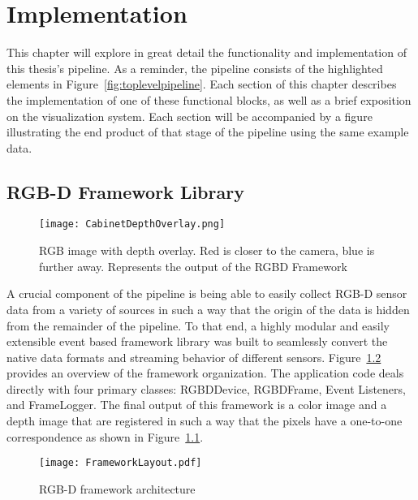 \chapter{Implementation}
\label{chap:implementation}
This chapter will explore in great detail the functionality and implementation of this thesis's pipeline. As a reminder, the pipeline consists of the highlighted elements in Figure~\ref{fig:toplevelpipeline}. Each section of this chapter describes the implementation of one of these functional blocks, as well as a brief exposition on the visualization system. Each section will be accompanied by a figure illustrating the end product of that stage of the pipeline using the same example data.

\section{RGB-D Framework Library}
\begin{figure}[ht]
    \centering
    \texttt{[image: CabinetDepthOverlay.png]}
    \caption{RGB image with depth overlay. Red is closer to the camera, blue is further away. Represents the output of the RGBD Framework}
    \label{fig:rgbdframeworkoutput}
\end{figure}
A crucial component of the pipeline is being able to easily collect RGB-D sensor data from a variety of sources in such a way that the origin of the data is hidden from the remainder of the pipeline. To that end, a highly modular and easily extensible event based framework library was built to seamlessly convert the native data formats and streaming behavior of different sensors. Figure~\ref{fig:rgbdframework} provides an overview of the framework organization. The application code deals directly with four primary classes: RGBDDevice, RGBDFrame, Event Listeners, and FrameLogger. The final output of this framework is a color image and a depth image that are registered in such a way that the pixels have a one-to-one correspondence as shown in Figure~\ref{fig:rgbdframeworkoutput}.
\begin{figure}[ht]
    \centering
    \texttt{[image: FrameworkLayout.pdf]}
    \caption{RGB-D framework architecture}
    \label{fig:rgbdframework}
\end{figure}
